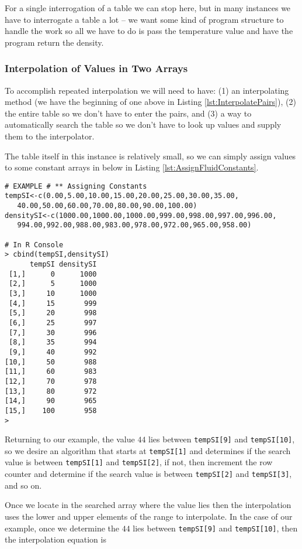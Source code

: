 For a single interrogation of a table we can stop here, but in many instances we have to interrogate a table a lot -- we want some kind of program structure to handle the work so all we have to do is pass the temperature value and have the program return the density.

\subsubsection{Interpolation of Values in Two Arrays}
To accomplish repeated interpolation we will need to have: (1) an interpolating method (we have the beginning of one above in Listing \ref{lst:InterpolatePairs}), (2) the entire table so we don't have to enter the pairs, and (3) a way to  automatically search the table so we don't have to look up values and supply them to the interpolator.

The table itself in this instance is relatively small, so we can simply assign values to some constant arrays in below in Listing \ref{lst:AssignFluidConstants}.

\begin{lstlisting}[caption=R code assigning Liquid Properties, label=lst:AssignFluidConstants]
# EXAMPLE # ** Assigning Constants
tempSI<-c(0.00,5.00,10.00,15.00,20.00,25.00,30.00,35.00,
   40.00,50.00,60.00,70.00,80.00,90.00,100.00)
densitySI<-c(1000.00,1000.00,1000.00,999.00,998.00,997.00,996.00,
   994.00,992.00,988.00,983.00,978.00,972.00,965.00,958.00)

# In R Console
> cbind(tempSI,densitySI)
      tempSI densitySI
 [1,]      0      1000
 [2,]      5      1000
 [3,]     10      1000
 [4,]     15       999
 [5,]     20       998
 [6,]     25       997
 [7,]     30       996
 [8,]     35       994
 [9,]     40       992
[10,]     50       988
[11,]     60       983
[12,]     70       978
[13,]     80       972
[14,]     90       965
[15,]    100       958
> 
\end{lstlisting}  

Returning to our example, the value $44$ lies between \texttt{tempSI[9]} and \texttt{tempSI[10]}, so we desire an algorithm that starts at \texttt{tempSI[1]} and determines if the search value is between \texttt{tempSI[1]} and \texttt{tempSI[2]}, if not, then increment the row counter and determine if the search value is between \texttt{tempSI[2]} and \texttt{tempSI[3]}, and so on.

Once we locate in the searched array where the value lies then the interpolation uses the lower and upper elements of the range to interpolate.  In the case of our example, once we determine the $44$ lies between  \texttt{tempSI[9]} and \texttt{tempSI[10]}, then the interpolation equation is

